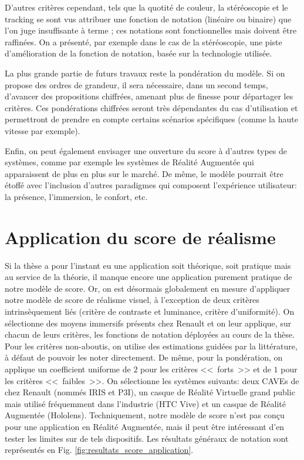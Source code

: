 	\par D'autres critères cependant, tels que la quotité de couleur, la stéréoscopie et le tracking se sont vus attribuer une fonction de notation (linéaire ou binaire) que l'on juge insuffisante à terme ; ces notations sont fonctionnelles mais doivent être raffinées. On a présenté, par exemple dans le cas de la stéréoscopie, une piste d'amélioration de la fonction de notation, basée sur la technologie utilisée.
	
	\par La plus grande partie de futurs travaux reste la pondération du modèle. Si on propose des ordres de grandeur, il sera nécessaire, dans un second temps, d'avancer des propositions chiffrées, amenant plus de finesse pour départager les critères. Ces pondérations chiffrées seront très dépendantes du cas d'utilisation et permettront de prendre en compte certains scénarios spécifiques (comme la haute vitesse par exemple).
	
	\par Enfin, on peut également envisager une ouverture du score à d'autres types de systèmes, comme par exemple les systèmes de Réalité Augmentée qui apparaissent de plus en plus sur le marché. De même, le modèle pourrait être étoffé avec l'inclusion d'autres paradigmes qui composent l'expérience utilisateur: la présence, l'immersion, le confort, etc.

\section*{Application du score de réalisme}
\par Si la thèse a pour l'instant eu une application soit théorique, soit pratique mais au service de la théorie, il manque encore une application purement pratique de notre modèle de score. Or, on est désormais globalement en mesure d'appliquer notre modèle de score de réalisme visuel, à l'exception de deux critères intrinsèquement liés (critère de contraste et luminance, critère d'uniformité). On sélectionne des moyens immersifs présents chez Renault et on leur applique, sur chacun de leurs critères, les fonctions de notation déployées au cours de la thèse. Pour les critères non-aboutis, on utilise des estimations guidées par la littérature, à défaut de pouvoir les noter directement. De même, pour la pondération, on applique un coefficient uniforme de $2$ pour les critères <<~forts~>> et de $1$ pour les critères <<~faibles~>>. On sélectionne les systèmes suivants: deux CAVEs de chez Renault (nommés IRIS et P3I), un casque de Réalité Virtuelle grand public mais utilisé fréquemment dans l'industrie (HTC Vive) et un casque de Réalité Augmentée (Hololens). Techniquement, notre modèle de score n'est pas conçu pour une application en Réalité Augmentée, mais il peut être intéressant d'en tester les limites sur de tels dispositifs. Les résultats généraux de notation sont représentés en Fig. \ref{fig:resultats_score_application}.

